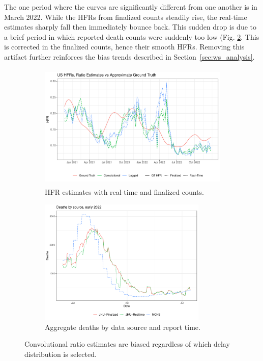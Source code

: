 \documentclass{article}
\begin{document}
The one period where the curves are significantly different from one another is in March 2022. While the HFRs from finalized counts steadily rise, the real-time estimates sharply fall then immediately bounce back. This sudden drop is due to a brief period in which reported death counts were suddenly too low (Fig. \ref{fig:source}. This is corrected in the finalized counts, hence their smooth HFRs. Removing this artifact further reinforces the bias trends described in Section~\ref{sec:ws_analysis}.

\begin{figure}
     \centering
     \begin{subfigure}[b]{0.45\linewidth}
         \centering
         \includegraphics[height=6cm]{Figs/Real/US_ests_realtime_both.pdf}
         \caption{HFR estimates with real-time and finalized counts.}
         \label{fig:rt_and_final}
     \end{subfigure}
     \hfill
     \begin{subfigure}[b]{0.45\linewidth}
         \centering
         \includegraphics[height=6cm]{Figs/Real/death_curves.pdf}
         \caption{Aggregate deaths by data source and report time.}
         \label{fig:source}
     \end{subfigure}
        \caption{Convolutional ratio estimates are biased regardless of which delay distribution is selected.}
        \label{fig:real_time_vs_finalized}
\end{figure}
\end{document}
